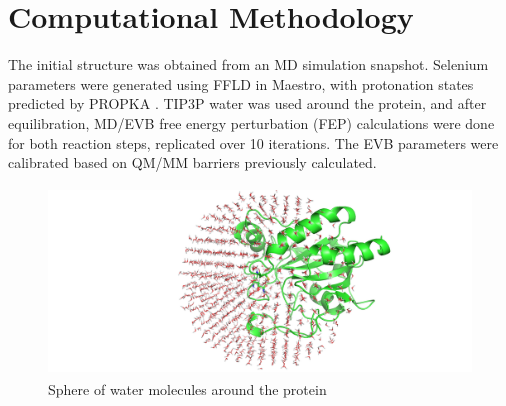 \documentclass[journal=jacsat,manuscript=article]{achemso}
\begin{document}
\section{Computational Methodology}

The initial structure was obtained from an MD simulation snapshot. Selenium parameters were generated using FFLD in Maestro, with protonation states predicted by PROPKA \cite{Søndergaard2011}. TIP3P water was used around the protein, and after equilibration, MD/EVB free energy perturbation (FEP) calculations were done for both reaction steps, replicated over 10 iterations. The EVB parameters were calibrated based on QM/MM barriers previously calculated.

\begin{figure}
\begin{center}
\includegraphics[width=0.7\linewidth, height=5cm]{figures/solvent_sphere.png} 
\end{center}
\caption{Sphere of water molecules around the protein}
\label{fig:figure6}
\end{figure}

\medskip



\end{document}
